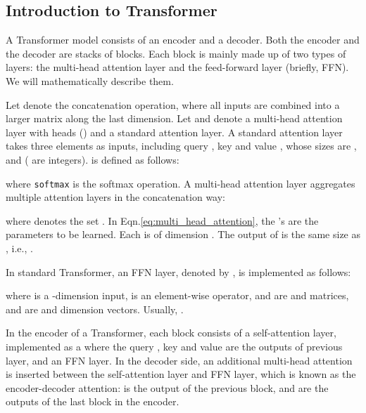 \documentclass{article}
\begin{document}
\subsection{Introduction to Transformer}
A Transformer model consists of an encoder and a decoder. Both the encoder and the decoder are stacks of blocks. Each block is mainly made up of two types of layers: the multi-head attention layer and the feed-forward layer (briefly, FFN). We will mathematically describe them.

Let  denote the concatenation operation, where all inputs are combined into a larger matrix along the last dimension. Let  and  denote a multi-head attention layer with  heads () and a standard attention layer. A standard  attention layer~\cite{bahdanau2015neural,vaswani2017attention} takes three elements as inputs, including query , key  and value , whose sizes are ,  and  ( are integers).  is defined as follows: 

where \texttt{softmax} is the softmax operation. A multi-head attention layer aggregates multiple attention layers in the concatenation way:

where  denotes the set . In Eqn.\eqref{eq:multi_head_attention}, the 's are the parameters to be learned. Each  is of dimension . The output of  is the same size as , i.e., .

In standard Transformer, an FFN layer, denoted by , is implemented as follows:

where  is a -dimension input,  is an element-wise operator,  and  are  and  matrices,  and  are  and  dimension vectors. Usually, .



In the encoder of a Transformer, each block consists of a self-attention layer, implemented as a  where the query , key  and value  are the outputs of previous layer, and an FFN layer. In the decoder side, an additional multi-head attention is inserted between the self-attention layer and FFN layer, which is known as the encoder-decoder attention:  is the output of the previous block,  and  are the outputs of the last block in the encoder. 
\end{document}
